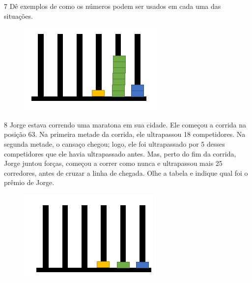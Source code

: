 
\pagebreak
\num{7} Dê exemplos de como os números podem ser usados em cada uma das
situações.

\begin{figure}[htpb!]
\includegraphics[width=\textwidth]{./media/image9.png}
\end{figure}


\pagebreak

\num{8} Jorge estava correndo uma maratona em sua cidade. Ele começou a corrida
na posição 63. Na primeira metade da corrida, ele ultrapassou 18
competidores. Na segunda metade, o cansaço chegou; logo, ele foi
ultrapassado por 5 desses competidores que ele havia ultrapassado antes.
Mas, perto do fim da corrida, Jorge juntou forças, começou a correr como
nunca e ultrapassou mais 25 corredores, antes de cruzar a linha de
chegada. Olhe a tabela e indique qual foi o prêmio de Jorge.

\begin{figure}[htpb!]
\includegraphics[width=\textwidth]{./media/image10.png}
\end{figure}

